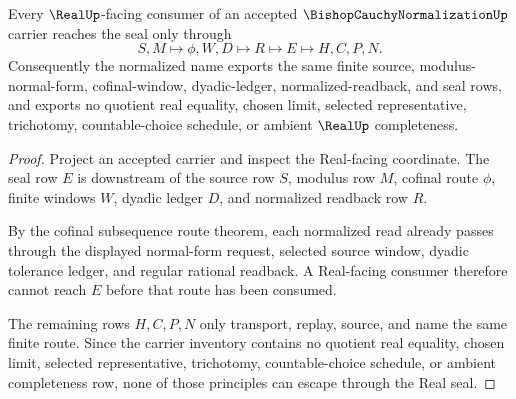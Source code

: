\begin{theorem}
\label{thm:bishop-cauchy-normalization-real-seal-nonescape}
Every $\RealUp$-facing consumer of an accepted $\BishopCauchyNormalizationUp$ carrier reaches the seal only through
$$
S,M \longmapsto \phi,W,D \longmapsto R \longmapsto E \longmapsto H,C,P,N .
$$
Consequently the normalized name exports the same finite source, modulus-normal-form, cofinal-window, dyadic-ledger, normalized-readback, and seal rows, and exports no quotient real equality, chosen limit, selected representative, trichotomy, countable-choice schedule, or ambient $\RealUp$ completeness.
\end{theorem}
\begin{proof}
Project an accepted carrier and inspect the Real-facing coordinate. The seal row $E$ is downstream of the source row $S$, modulus row $M$, cofinal route $\phi$, finite windows $W$, dyadic ledger $D$, and normalized readback row $R$.

By the cofinal subsequence route theorem, each normalized read already passes through the displayed normal-form request, selected source window, dyadic tolerance ledger, and regular rational readback. A Real-facing consumer therefore cannot reach $E$ before that route has been consumed.

The remaining rows $H,C,P,N$ only transport, replay, source, and name the same finite route. Since the carrier inventory contains no quotient real equality, chosen limit, selected representative, trichotomy, countable-choice schedule, or ambient completeness row, none of those principles can escape through the Real seal.
\end{proof}



